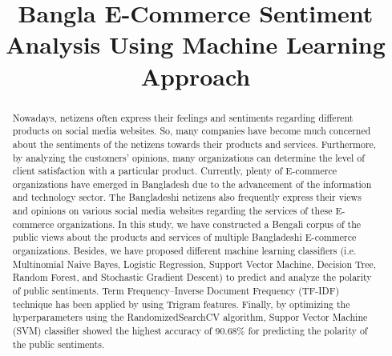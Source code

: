 \documentclass[conference]{IEEEtran}
\begin{document}
\title{Bangla E-Commerce Sentiment Analysis
Using Machine Learning Approach
\\


}

\author{
\and
{}
\and 
{}
\and


}

\maketitle

\begin{abstract}
Nowadays, netizens often express their feelings and sentiments regarding different products on social media websites. So, many companies have become much concerned about the sentiments of the netizens towards their products and services. Furthermore, by analyzing the customers' opinions, many organizations can determine the level of client satisfaction with a particular product. Currently, plenty of E-commerce organizations have emerged in Bangladesh due to the advancement of the information and technology sector. The Bangladeshi netizens also frequently express their views and opinions on various social media websites regarding the services of these E-commerce organizations. In this study, we have constructed a Bengali corpus of the public views about the products and services of multiple Bangladeshi E-commerce organizations. Besides, we have proposed different machine learning classifiers (i.e. Multinomial Naive Bayes, Logistic Regression, Support Vector Machine, Decision Tree, Random Forest, and Stochastic Gradient Descent) to predict and analyze the polarity of public sentiments. Term Frequency–Inverse Document Frequency (TF-IDF) technique has been applied by using Trigram features. Finally, by optimizing the hyperparameters using the RandomizedSearchCV algorithm, Suppor Vector Machine (SVM) classifier showed the highest accuracy of 90.68\% for predicting the polarity of the public sentiments.
\end{abstract}
\end{document}
